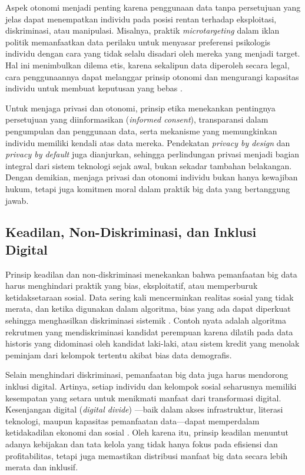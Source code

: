 Aspek otonomi menjadi penting karena penggunaan data tanpa persetujuan yang jelas dapat menempatkan individu pada posisi rentan terhadap eksploitasi, diskriminasi, atau manipulasi. Misalnya, praktik \textit{microtargeting} dalam iklan politik memanfaatkan data perilaku untuk menyasar preferensi psikologis individu dengan cara yang tidak selalu disadari oleh mereka yang menjadi target. Hal ini menimbulkan dilema etis, karena sekalipun data diperoleh secara legal, cara penggunaannya dapat melanggar prinsip otonomi dan mengurangi kapasitas individu untuk membuat keputusan yang bebas \cite{tufekci2015}.  

Untuk menjaga privasi dan otonomi, prinsip etika menekankan pentingnya persetujuan yang diinformasikan (\textit{informed consent}), transparansi dalam pengumpulan dan penggunaan data, serta mekanisme yang memungkinkan individu memiliki kendali atas data mereka. Pendekatan \textit{privacy by design} dan \textit{privacy by default} juga dianjurkan, sehingga perlindungan privasi menjadi bagian integral dari sistem teknologi sejak awal, bukan sekadar tambahan belakangan. Dengan demikian, menjaga privasi dan otonomi individu bukan hanya kewajiban hukum, tetapi juga komitmen moral dalam praktik big data yang bertanggung jawab.

\subsection{Keadilan, Non-Diskriminasi, dan Inklusi Digital}

Prinsip keadilan dan non-diskriminasi menekankan bahwa pemanfaatan big data harus menghindari praktik yang bias, eksploitatif, atau memperburuk ketidaksetaraan sosial. Data sering kali mencerminkan realitas sosial yang tidak merata, dan ketika digunakan dalam algoritma, bias yang ada dapat diperkuat sehingga menghasilkan diskriminasi sistemik \cite{barocas2016big}. Contoh nyata adalah algoritma rekrutmen yang mendiskriminasi kandidat perempuan karena dilatih pada data historis yang didominasi oleh kandidat laki-laki, atau sistem kredit yang menolak peminjam dari kelompok tertentu akibat bias data demografis.  

Selain menghindari diskriminasi, pemanfaatan big data juga harus mendorong inklusi digital. Artinya, setiap individu dan kelompok sosial seharusnya memiliki kesempatan yang setara untuk menikmati manfaat dari transformasi digital. Kesenjangan digital (\textit{digital divide}) —baik dalam akses infrastruktur, literasi teknologi, maupun kapasitas pemanfaatan data—dapat memperdalam ketidakadilan ekonomi dan sosial \cite{hilbert2011digital}. Oleh karena itu, prinsip keadilan menuntut adanya kebijakan dan tata kelola yang tidak hanya fokus pada efisiensi dan profitabilitas, tetapi juga memastikan distribusi manfaat big data secara lebih merata dan inklusif.

